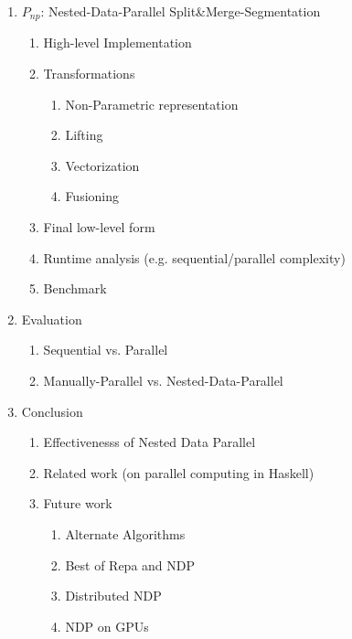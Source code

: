\documentclass{article}
\newcommand{\ndp}[0]{$P_{np}$}
\newcommand{\algo}[0]{Split\&Merge-Segmentation}
\begin{document}
\begin{enumerate}
        \item \ndp: Nested-Data-Parallel \algo
            \begin{enumerate}
            \item High-level Implementation
            \item Transformations
                \begin{enumerate}
                \item Non-Parametric representation
                \item Lifting
                \item Vectorization
                \item Fusioning
                \end{enumerate}
            \item Final low-level form
            \item Runtime analysis {\tiny (e.g. sequential/parallel complexity)}
            \item Benchmark
            \end{enumerate}
            
        \item Evaluation
            \begin{enumerate}
            \item Sequential vs. Parallel   
            \item Manually-Parallel vs. Nested-Data-Parallel
            \end{enumerate}
        
        \item Conclusion
            \begin{enumerate}
            \item Effectivenesss of Nested Data Parallel
            \item Related work {\tiny (on parallel computing in Haskell)}
            \item Future work
                \begin{enumerate}
                    \item Alternate Algorithms
                    \item Best of Repa and NDP
                    \item Distributed NDP
                    \item NDP on GPUs
                \end{enumerate}
            \end{enumerate}
        \end{enumerate}
            
\end{document}
